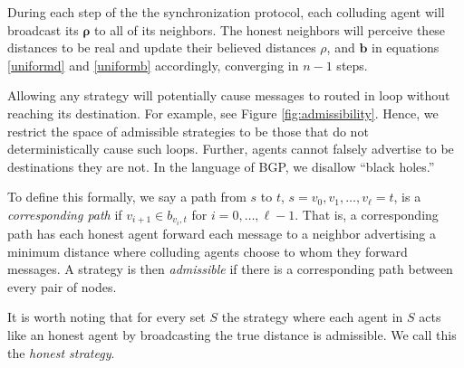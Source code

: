 \documentclass{comnet}
\begin{document}
During each step of the the synchronization protocol, each colluding agent will broadcast its $\mathbf{\rho}$ to all of its neighbors. The honest neighbors will perceive these distances to be real and update their believed distances $\rho$, and $\mathbf{b}$ in equations \ref{uniformd} and \ref{uniformb} accordingly, converging in $n-1$ steps. 

Allowing any strategy will potentially cause messages to routed in loop without reaching its destination. For example, see Figure \ref{fig:admissibility}. Hence, we restrict the space of admissible strategies to be those that do not deterministically cause such loops. Further, agents cannot falsely advertise to be destinations they are not. In the language of BGP, we disallow ``black holes.'' 

To define this formally, we say a path from $s$ to $t$, $s= v_0, v_1, \ldots, v_{\ell} =  t$, is a {\it corresponding path} if $v_{i+1} \in b_{v_i,t}$ for $i=0, \ldots, \ell-1$. That is, a corresponding path has each honest agent forward each message to a neighbor advertising a minimum distance where colluding agents choose to whom they forward messages. A strategy is then \emph{admissible} if there is a corresponding path between every pair of nodes. 

It is worth noting that for every set $S$ the strategy where each agent in $S$ acts like an honest agent by broadcasting the true distance is admissible. We call this the {\it honest strategy}.
\end{document}
